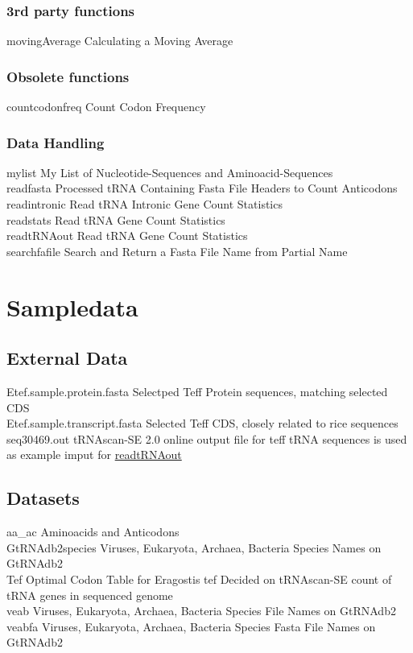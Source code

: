 \subsubsection{3rd party functions}
movingAverage	\quad Calculating a Moving Average \\

\subsubsection{Obsolete functions}
countcodonfreq	\quad Count Codon Frequency \\

\subsubsection{Data Handling}
mylist	\quad My List of Nucleotide-Sequences and Aminoacid-Sequences \\
readfasta	\quad Processed tRNA Containing Fasta File Headers to Count Anticodons \\
readintronic	\quad Read tRNA Intronic Gene Count Statistics \\
readstats	\quad Read tRNA Gene Count Statistics \\
\hypertarget{function:rtRNAo}{readtRNAout}	\quad Read tRNA Gene Count Statistics \\
searchfafile	\quad Search and Return a Fasta File Name from Partial Name \\

\section{Sampledata}

\subsection{External Data}
Etef.sample.protein.fasta \quad Selectped Teff Protein sequences, matching selected CDS \\
Etef.sample.transcript.fasta \quad  Selected Teff CDS, closely related to rice sequences \\
\hypertarget{data:tRNAlist}{seq30469.out} \quad tRNAscan-SE 2.0 online output file for teff tRNA sequences is used as example imput for \hyperlink{function:rtRNAo}{readtRNAout} \\

\subsection{Datasets}
aa\_ac	\quad Aminoacids and Anticodons \\
GtRNAdb2species	\quad Viruses, Eukaryota, Archaea, Bacteria Species Names on GtRNAdb2 \\
Tef	\quad Optimal Codon Table for Eragostis tef Decided on tRNAscan-SE count of tRNA genes in sequenced genome \\
\hypertarget{data:veab}{veab}		\quad Viruses, Eukaryota, Archaea, Bacteria Species File Names on GtRNAdb2 \\
veabfa	\quad Viruses, Eukaryota, Archaea, Bacteria Species Fasta File Names on GtRNAdb2 \\




